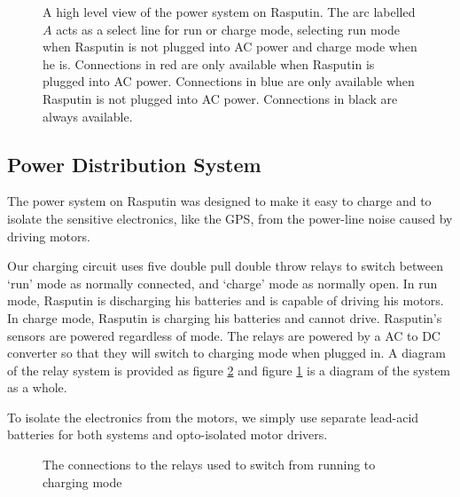\documentclass[master.tex]{subfiles}
\begin{document}
\begin{figure}
  
  \caption{A high level view of the power system on Rasputin.
    The arc labelled $A$ acts as a select line for run or charge mode, selecting run mode when Rasputin is not plugged into AC power and charge mode when he is.
    Connections in {\color{red} red} are only available when Rasputin is plugged into AC power.
    Connections in {\color{blue} blue} are only available when Rasputin is not plugged into AC power.
    Connections in black are always available.}
  \label{power-distrobution-diagram}
\end{figure}
\subsection{Power Distribution System}
The power system on Rasputin was designed to make it easy to charge and to isolate the sensitive electronics, like the GPS, from the power-line noise caused by driving motors.

Our charging circuit uses five double pull double throw relays to switch between `run' mode as normally connected, and `charge' mode as normally open.
In run mode, Rasputin is discharging his batteries and is capable of driving his motors.
In charge mode, Rasputin is charging his batteries and cannot drive.
Rasputin's sensors are powered regardless of mode.
The relays are powered by a AC to DC converter so that they will switch to charging mode when plugged in.
A diagram of the relay system is provided as figure \ref{relay-diagram} and figure \ref{power-distrobution-diagram} is a diagram of the system as a whole.

To isolate the electronics from the motors, we simply use separate lead-acid batteries for both systems and opto-isolated motor drivers.
\begin{figure}
  
  \caption{The connections to the relays used to switch from running to charging mode}
  \label{relay-diagram}
\end{figure}
\end{document}
